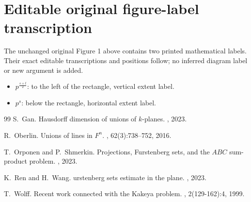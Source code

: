 \documentclass[10pt]{article}
\begin{document}
\section*{Editable original figure-label transcription}
\noindent The unchanged original Figure 1 above contains two printed mathematical labels. Their exact editable transcriptions and positions follow; no inferred diagram label or new argument is added.
\begin{itemize}
\item $p^{\frac{s+t}{2}}$: to the left of the rectangle, vertical extent label.
\item $p^s$: below the rectangle, horizontal extent label.
\end{itemize}
\begin{thebibliography}{99}
S.~Gan.
\newblock Hausdorff dimension of unions of $k$-planes.
, 2023.

R.~Oberlin.
\newblock Unions of lines in ${F}^n$.
, 62(3):738--752, 2016.

T.~Orponen and P.~Shmerkin.
\newblock Projections, {F}urstenberg sets, and the $ {ABC} $ sum-product problem.
, 2023.

K.~Ren and H.~Wang.
urstenberg sets estimate in the plane.
, 2023.

T.~Wolff.
\newblock Recent work connected with the {K}akeya problem.
, 2(129-162):4, 1999.


\end{thebibliography}
\end{document}
